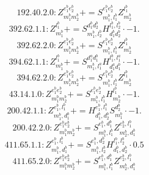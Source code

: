 \documentclass[letterpaper,10pt,fleqn,leqno,onecolumn]{article}
\begin{document}
\begin{equation} \;\;\;\;\;\;  192.40.2.0: Z^{e_{1}^{b}e_{2}^{b}}_{m_{1}^{b}m_{2}^{b}}+=S^{e_{1}^{b}e_{2}^{b}}_{m_{1}^{b},l_{1}^{b}}Z^{l_{1}^{b}}_{m_{2}^{b}} \end{equation}
\begin{equation} \;\;\;\;\;\;  392.62.1.1: Z^{l_{1}^{b}}_{m_{1}^{b}}+=S^{d_{1}^{b}d_{2}^{b}}_{m_{1}^{b},l_{2}^{b}}H^{l_{1}^{b},l_{2}^{b}}_{d_{1}^{b}d_{2}^{b}}\cdot -1. \end{equation}
\begin{equation} \;\;\;\;\;\;  392.62.2.0: Z^{e_{1}^{b}e_{2}^{b}}_{m_{1}^{b}m_{2}^{b}}+=S^{e_{1}^{b}e_{2}^{b}}_{m_{1}^{b},l_{1}^{b}}Z^{l_{1}^{b}}_{m_{2}^{b}} \end{equation}
\begin{equation} \;\;\;\;\;\;  394.62.1.1: Z^{l_{1}^{b}}_{m_{1}^{b}}+=S^{d_{1}^{a}d_{1}^{b}}_{m_{1}^{b},l_{1}^{a}}H^{l_{1}^{b},l_{1}^{a}}_{d_{1}^{a}d_{1}^{b}}\cdot -1. \end{equation}
\begin{equation} \;\;\;\;\;\;  394.62.2.0: Z^{e_{1}^{b}e_{2}^{b}}_{m_{1}^{b}m_{2}^{b}}+=S^{e_{1}^{b}e_{2}^{b}}_{m_{1}^{b},l_{1}^{b}}Z^{l_{1}^{b}}_{m_{2}^{b}} \end{equation}
\begin{equation} \;\;\;\;\;\;  43.14.1.0: Z^{e_{1}^{b}e_{2}^{b}}_{m_{1}^{b}m_{2}^{b}}+=S^{e_{1}^{b}e_{2}^{b}}_{m_{1}^{b},l_{1}^{b}}H^{l_{1}^{b}}_{m_{2}^{b}}\cdot -1. \end{equation}
\begin{equation} \;\;\;\;\;\;  200.42.1.1: Z^{e_{1}^{b},l_{1}^{b}}_{m_{1}^{b},d_{1}^{b}}+=H^{e_{1}^{b},l_{1}^{b}}_{d_{1}^{b},d_{2}^{b}}S^{d_{2}^{b}}_{m_{1}^{b}}\cdot -1. \end{equation}
\begin{equation} \;\;\;\;\;\;  200.42.2.0: Z^{e_{1}^{b}e_{2}^{b}}_{m_{1}^{b}m_{2}^{b}}+=S^{e_{1}^{b},d_{1}^{b}}_{m_{1}^{b},l_{1}^{b}}Z^{e_{2}^{b},l_{1}^{b}}_{m_{2}^{b},d_{1}^{b}} \end{equation}
\begin{equation} \;\;\;\;\;\;  411.65.1.1: Z^{e_{1}^{b},l_{1}^{b}}_{m_{1}^{b},d_{1}^{b}}+=S^{e_{1}^{b},d_{2}^{b}}_{m_{1}^{b},l_{2}^{b}}H^{l_{1}^{b},l_{2}^{b}}_{d_{1}^{b},d_{2}^{b}}\cdot 0.5 \end{equation}
\begin{equation} \;\;\;\;\;\;  411.65.2.0: Z^{e_{1}^{b}e_{2}^{b}}_{m_{1}^{b}m_{2}^{b}}+=S^{e_{1}^{b},d_{1}^{b}}_{m_{1}^{b},l_{1}^{b}}Z^{e_{2}^{b},l_{1}^{b}}_{m_{2}^{b},d_{1}^{b}} \end{equation}
\end{document}
